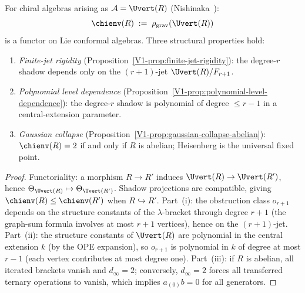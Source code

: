 \begin{proposition}
\ClaimStatusProvedHere
{}
For chiral algebras arising as $\cA = \Uvert(R)$
\textup{(}Nishinaka~\cite{Nish26}\textup{)}:
\begin{equation}%
\chienv(R)
\;:=\;
\rho_{\mathrm{grav}}(\Uvert(R))
\end{equation}
is a functor on Lie conformal algebras. Three structural
properties hold:
\begin{enumerate}[label=\textup{(\roman*)}]
\item \emph{Finite-jet rigidity}
 \textup{(}Proposition~\ref{V1-prop:finite-jet-rigidity}\textup{)}:
 the degree-$r$ shadow depends only on the $(r{+}1)$-jet
 $\Uvert(R)/F_{r+1}$.
\item \emph{Polynomial level dependence}
 \textup{(}Proposition~\ref{V1-prop:polynomial-level-dependence}\textup{)}:
 the degree-$r$ shadow is polynomial of degree $\leq r{-}1$ in
 a central-extension parameter.
\item \emph{Gaussian collapse}
 \textup{(}Proposition~\ref{V1-prop:gaussian-collapse-abelian}\textup{)}:
 $\chienv(R) = 2$ if and only if $R$ is abelian; Heisenberg is
 the universal fixed point.
\end{enumerate}
\end{proposition}

\begin{proof}
Functoriality: a morphism $R \to R'$ induces
$\Uvert(R) \to \Uvert(R')$, hence
$\Theta_{\Uvert(R)} \mapsto \Theta_{\Uvert(R')}$.
Shadow projections are compatible, giving
$\chienv(R) \leq \chienv(R')$ when $R \hookrightarrow R'$.
Part~(i): the obstruction class $o_{r+1}$ depends on
the structure constants of the $\lambda$-bracket through
degree $r+1$ (the graph-sum formula involves at most $r+1$
vertices), hence on the $(r{+}1)$-jet.
Part~(ii): the structure constants of $\Uvert(R)$ are polynomial
in the central extension $k$ (by the OPE expansion), so
$o_{r+1}$ is polynomial in $k$ of degree at most $r-1$
(each vertex contributes at most degree one).
Part~(iii): if $R$ is abelian, all iterated brackets vanish
and $d_\infty = 2$; conversely, $d_\infty = 2$ forces
all transferred ternary operations to vanish, which implies
$a_{(0)}b = 0$ for all generators.
\end{proof}

